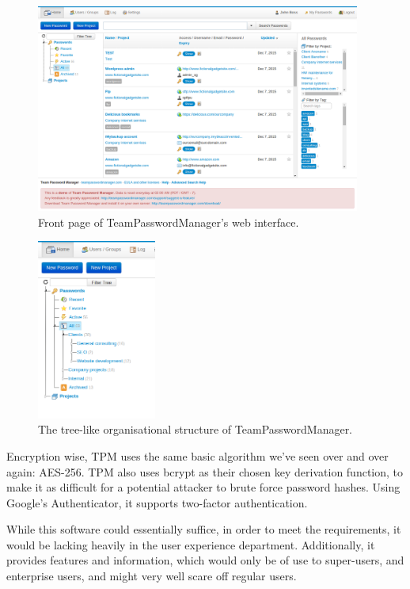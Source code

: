 			\begin{figure}[htbp]
				\centering
				\includegraphics[width=0.95\textwidth]{figures/analysis/teampasswordmanager_main.png}
				\caption{Front page of TeamPasswordManager's web interface.}
				\label{fig:teampasswordmanager_main}
			\end{figure}

			\begin{figure}[htbp]
				\centering
				\includegraphics[width=0.35\textwidth]{figures/analysis/teampasswordmanager_tree.png}
				\caption{The tree-like organisational structure of TeamPasswordManager.}
				\label{fig:teampasswordmanager_tree}
			\end{figure}

			Encryption wise, TPM uses the same basic algorithm we've seen over and over again: AES-256. TPM also uses bcrypt as their chosen key derivation function, to make it as difficult for a potential attacker to brute force password hashes. Using Google's Authenticator, it supports two-factor authentication.

			While this software could essentially suffice, in order to meet the requirements, it would be lacking heavily in the user experience department. Additionally, it provides features and information, which would only be of use to super-users, and enterprise users, and might very well scare off regular users.

